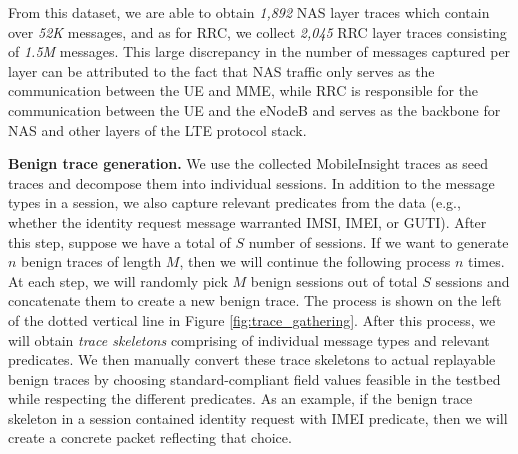 From this dataset, we are able to obtain \textit{1,892} NAS layer traces which
contain over \textit{52K} messages, and as for RRC, we collect \textit{2,045}
RRC layer traces consisting of \textit{1.5M} messages. This large discrepancy
in the number of messages captured per layer can be attributed to the fact that
NAS traffic only serves as the communication between the UE and MME, while RRC
is responsible for the communication between the UE and the eNodeB and serves
as the backbone for NAS and other layers of the LTE protocol stack.

\textbf{Benign trace generation.} We use the collected MobileInsight
traces as seed traces and decompose them into individual sessions. In addition to
the message types in a session, we also capture relevant predicates from the data
(e.g., whether the identity request message warranted IMSI, IMEI, or GUTI).
After this step, suppose we have a total of $S$ number of sessions. If we want
 to generate $n$ benign traces of length $M$, then we will continue
the following process $n$ times. At each step, we will randomly pick $M$
benign sessions out of total $S$ sessions and concatenate them to create a new benign
trace. The process is shown on the left of the dotted vertical line in Figure \ref{fig:trace_gathering}.
After this process, we will obtain \emph{trace skeletons} comprising of individual message types and relevant
predicates. We then manually convert these trace skeletons to actual replayable benign traces
by choosing standard-compliant field values feasible in the testbed while respecting the different predicates. As an example,
if the benign trace skeleton in a session contained identity request with IMEI predicate, then we will create a
concrete packet reflecting that choice.


